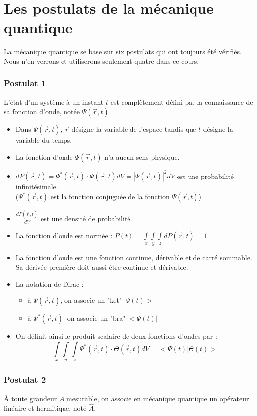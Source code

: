 \documentclass[../main.tex]{subfile}
\begin{document}
\part{Les postulats de la mécanique quantique}
La mécanique quantique se base sur six postulats qui ont toujours été vérifiés. Nous n'en verrons et utiliserons seulement quatre dans ce cours.

\section{Postulat 1}
L'état d'un système à un instant $t$ est complètement défini par la connaissance de sa fonction d'onde, notée $\Psi (\vec{r}, t)$.

\begin{itemize}
	\item Dans $\Psi (\vec{r}, t)$, $\vec{r}$ désigne la variable de l'espace tandis que $t$ désigne la variable du temps.
	\item La fonction d'onde $\Psi(\vec{r}, t)$ n'a aucun sens physique.
	\item $dP(\vec{r}, t) = \Psi^*(\vec{r}, t) \cdot \Psi(\vec{r}, t) dV = |\Psi(\vec{r}, t)|^2 dV$ est une probabilité infinitésimale.
	\\($\Psi^*(\vec{r}, t)$ est la fonction conjuguée de la fonction $\Psi(\vec{r}, t)$)
	\item $\frac{dP(\vec{r}, t)}{dV}$ est une densité de probabilité.
	\item La fonction d'onde est normée : $P(t) = \int\limits_{x}\int\limits_{y}\int\limits_{z} dP(\vec{r}, t) = 1$
	\item La fonction d'onde est une fonction continue, dérivable et de carré sommable. Sa dérivée première doit aussi être continue et dérivable.
	\item La notation de Dirac : \\
	\begin{itemize}
		\item à $\Psi(\vec{r}, t)$, on associe un "ket" $|\Psi(t)>$
		\item à $\Psi^*(\vec{r}, t)$, on associe un "bra" $<\Psi(t)|$
	\end{itemize}
	\item On définit ainsi le produit scalaire de deux fonctions d'ondes par :
	$$\int\limits_{x}\int\limits_{y}\int\limits_{z} \Psi^*(\vec{r}, t) \cdot \Theta(\vec{r}, t) dV = <\Psi(t) | \Theta(t)>$$
\end{itemize}


\section{Postulat 2}
\`A toute grandeur $A$ mesurable, on associe en mécanique quantique un opérateur linéaire et hermitique, noté $\hat{A}$.
\end{document}
